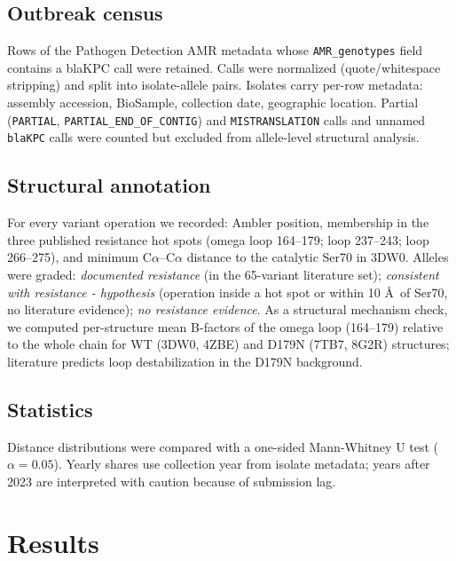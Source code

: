 \documentclass[11pt]{article}
\begin{document}
\subsection{Outbreak census}
Rows of the Pathogen Detection AMR metadata whose \texttt{AMR\_genotypes} field contains a blaKPC call were retained. Calls were normalized (quote/whitespace stripping) and split into isolate-allele pairs. Isolates carry per-row metadata: assembly accession, BioSample, collection date, geographic location. Partial (\texttt{PARTIAL}, \texttt{PARTIAL\_END\_OF\_CONTIG}) and \texttt{MISTRANSLATION} calls and unnamed \texttt{blaKPC} calls were counted but excluded from allele-level structural analysis.

\subsection{Structural annotation}
For every variant operation we recorded: Ambler position, membership in the three published resistance hot spots (omega loop 164--179; loop 237--243; loop 266--275), and minimum C$\alpha$--C$\alpha$ distance to the catalytic Ser70 in 3DW0. Alleles were graded: \emph{documented resistance} (in the 65-variant literature set); \emph{consistent with resistance - hypothesis} (operation inside a hot spot or within 10 \AA\ of Ser70, no literature evidence); \emph{no resistance evidence}. As a structural mechanism check, we computed per-structure mean B-factors of the omega loop (164--179) relative to the whole chain for WT (3DW0, 4ZBE) and D179N (7TB7, 8G2R) structures; literature predicts loop destabilization in the D179N background.

\subsection{Statistics}
Distance distributions were compared with a one-sided Mann-Whitney U test ($\alpha=0.05$). Yearly shares use collection year from isolate metadata; years after 2023 are interpreted with caution because of submission lag.

\section{Results}
\end{document}
